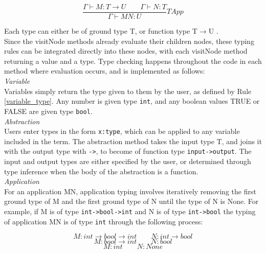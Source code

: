 \documentclass[a4paper,11pt]{report}
\begin{document}
\begin{equation*}
\frac{\Gamma \vdash M:T \to U \qquad \Gamma \vdash N:T}{\Gamma \vdash MN:U}TApp
\end{equation*}

Each type can either be of ground type T, or function type T$\rightarrow$U \cite{Hankin2004}.\\

Since the visitNode methods already evaluate their children nodes, these typing rules can be integrated directly into these nodes, with each visitNode method returning a value and a type. Type checking happens throughout the code in each method where evaluation occurs, and is implemented as follows:\\

\textit{Variable}\\
Variables simply return the type given to them by the user, as defined by Rule \ref{variable_type}. Any number is given type \texttt{int}, and any boolean values TRUE or FALSE are given type \texttt{bool}.\\

\textit{Abstraction}\\
Users enter types in the form \texttt{x:type}, which can be applied to any variable included in the term. The abstraction method takes the input type T, and joins it with the output type with \texttt{->}, to become of function type \texttt{input->output}. The input and output types are either specified by the user, or determined through type inference when the body of the abstraction is a function.\\

\textit{Application}\\
For an application MN, application typing involves iteratively removing the first ground type of M and the first ground type of N until the type of N is None. For example, if M is of type \texttt{int->bool->int} and N is of type \texttt{int->bool} the typing of application MN is of type \texttt{int} through the following process:

\begin{equation*}
M:int\rightarrow bool\rightarrow int \qquad N:int\rightarrow bool
\end{equation*}
\begin{equation*}
M:bool\rightarrow int \qquad N:bool
\end{equation*}
\begin{equation*}
M:int \qquad N:None
\end{equation*}
\end{document}
